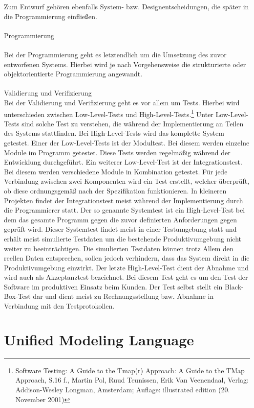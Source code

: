 Zum Entwurf gehören ebenfalls System- bzw. Designentscheidungen, die später in die Programmierung einfließen.
\\
\\
Programmierung\\
\\
Bei der Programmierung geht es letztendlich um die Umsetzung des zuvor entworfenen Systems. Hierbei wird je nach Vorgehensweise die strukturierte oder objektorientierte Programmierung angewandt.
\\
\\
Validierung und Verifizierung
\\
Bei der Validierung  und Verifizierung geht es vor allem um Tests. Hierbei wird unterschieden zwischen Low-Level-Tests und High-Level-Tests.\footnote{Software Testing: A Guide to the Tmap(r) Approach: A Guide to the TMap Approach, S.16 f., Martin Pol, Ruud Teunissen, Erik Van Veenendaal, Verlag: Addison-Wesley Longman, Amsterdam; Auflage: illustrated edition (20. November 2001)}
Unter Low-Level-Tests sind solche Test zu verstehen, die während der Implementierung an Teilen des Systems stattfinden. Bei High-Level-Tests wird das komplette System getestet. Einer der Low-Level-Tests ist der Modultest. Bei diesem werden einzelne Module im Programm getestet.  Diese Tests werden regelmäßig während der Entwicklung durchgeführt. Ein weiterer Low-Level-Test ist der Integrationstest. Bei diesem werden verschiedene Module in Kombination getestet. Für jede Verbindung zwischen zwei Komponenten wird ein Test erstellt, welcher überprüft, ob diese ordnungsgemäß nach der Spezifikation funktionieren. In kleineren Projekten findet der Integrationstest meist während der Implementierung durch die Programmierer statt.
Der so genannte Systemtest ist ein High-Level-Test bei dem das gesamte Programm gegen die zuvor definierten Anforderungen gegen geprüft wird. Dieser Systemtest findet meist in einer Testumgebung statt und erhält meist simulierte Testdaten um die bestehende Produktivumgebung nicht weiter zu beeinträchtigen. Die simulierten Testdaten können trotz Allem den reellen Daten entsprechen, sollen jedoch verhindern, dass das System direkt in die Produktivumgebung einwirkt.
Der letzte High-Level-Test dient der Abnahme und wird auch als Akzeptanztest bezeichnet. Bei diesem Test geht es um den Test der Software im produktiven Einsatz beim Kunden. Der Test selbst stellt ein Black-Box-Test dar und dient meist zu Rechnungsstellung bzw. Abnahme in Verbindung mit den Testprotokollen.

\section{Unified Modeling Language}
\label{sec:uml}

